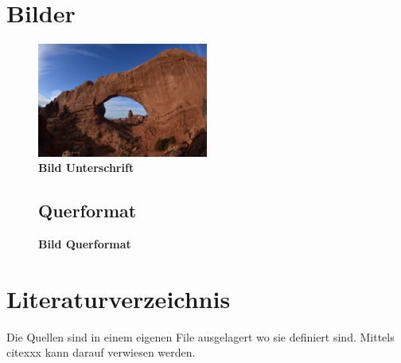 \section{Bilder}
\begin{figure}[htbp]
	\begin{center}
	\includegraphics[width=0.50\textwidth]{./images/sampleImage.jpg}
	\caption{\textbf{Bild Unterschrift}}
	\label{Bild Referenz}
	\end{center}
\end{figure}

\begin{landscape}
\begin{figure}[htbp]
\subsection{Querformat}
\centering
{}
\caption{\textbf{Bild Querformat}}
\end{figure}
\end{landscape}

\section{Literaturverzeichnis}
Die Quellen sind in einem eigenen File ausgelagert wo sie definiert sind. Mittels \\cite{xxx} kann darauf verwiesen werden.


